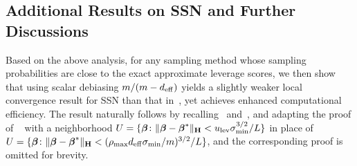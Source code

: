 \documentclass[11pt,a4paper]{article}
\begin{document}
\subsection{Additional Results on SSN and Further Discussions} 
\label{subsec:additional_SSN}

Based on the above analysis, for any sampling method whose sampling probabilities are close to the exact approximate leverage scores, we then show that using scalar debiasing $m/(m-d_{\mathrm{eff}})$ yields a slightly weaker local convergence result for SSN  than that in~, yet achieves enhanced computational efficiency. The result naturally follows  by
recalling~ and~,  and adapting the proof of ~ with a neighborhood  $U=\{\boldsymbol{\beta} \colon \|\boldsymbol{\beta}-\boldsymbol{\beta}^{\ast}\|_{\mathbf{H}}< u_{\rm lev}\sigma_{\min}^{3/2}/L\}$ in place of  $U=\{\boldsymbol{\beta} \colon \|\boldsymbol{\beta}-\boldsymbol{\beta}^{\ast}\|_{\mathbf{H}}< (\rho_{\max} d_{\mathrm{eff}} \sigma_{\min}/m)^{3/2}/L\}$,  and  the corresponding  proof  is omitted for brevity.
\end{document}
